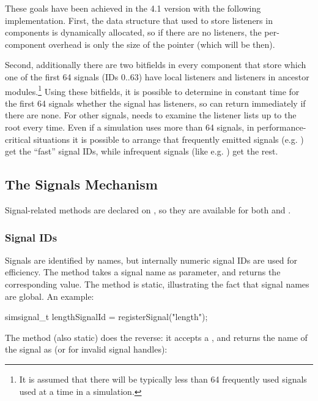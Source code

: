 These goals have been achieved in the 4.1 version with the following
implementation. First, the data structure that used to store listeners in
components is dynamically allocated, so if there are no listeners, the
per-component overhead is only the size of the pointer (which will be
 then).

Second, additionally there are two bitfields in every component that store
which one of the first 64 signals (IDs 0..63) have local listeners and
listeners in ancestor modules.\footnote{It is assumed that there will be
typically less than 64 frequently used signals used at a time in a
simulation.} Using these bitfields, it is possible to determine in constant
time for the first 64 signals whether the signal has listeners, so
 can return immediately if there are none. For other signals,
 needs to examine the listener lists up to the root every
time. Even if a simulation uses more than 64 signals, in
performance-critical situations it is possible to arrange that frequently
emitted signals (e.g. ) get the ``fast'' signal IDs, while
infrequent signals (like e.g. ) get the rest.


\subsection{The Signals Mechanism}
\label{sec:simple-modules:signals-api}

Signal-related methods are declared on , so they are available
for both  and .

\subsubsection{Signal IDs}
\label{sec:simple-modules:signal-ids}

Signals are identified by names, but internally numeric signal IDs are used
for efficiency. The  method takes a signal name as
parameter, and returns the corresponding  value.
The method is static, illustrating the fact that signal names are global.
An example:

\begin{cpp}
simsignal_t lengthSignalId = registerSignal("length");
\end{cpp}

The  method (also static) does the reverse:
it accepts a , and returns the name of the signal as
 (or  for invalid signal handles):

